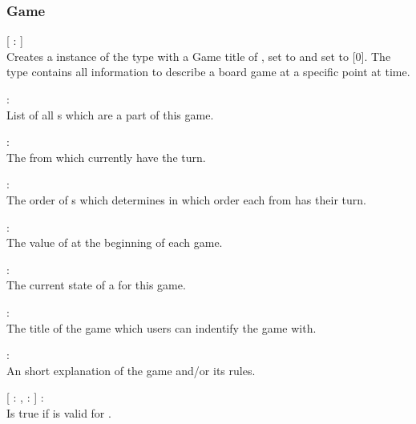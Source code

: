 \subsubsection{Game}
\begin{dlist}
  \item {}[ : ]\\
  Creates a instance of the  type with a Game title of ,  set to  and  set to [0]. The  type contains all information to describe a board game at a specific point at time.
  
  \item {} : \\
  List of all s which are a part of this game.
  
  \item {} : \\
  The  from  which currently have the turn.
  
  \item {} : \\
  The order of s which determines in which order each  from  has their turn.
  
  \item {} : \\
  The value of  at the beginning of each game.
  
  \item {} : \\
  The current state of a  for this game.
  
  \item {} : \\
  The title of the game which users can indentify the game with.
  
  \item {} : \\
  An short explanation of the game and/or its rules.
  
  \item {}[  : ,  :  ] : \\
  Is true if  is valid for .
  

\end{dlist}
